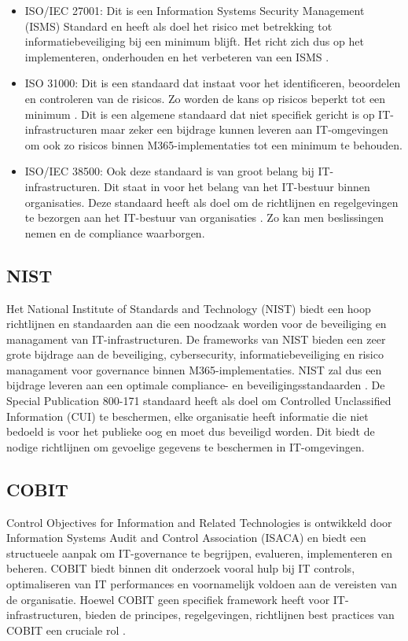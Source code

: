 \begin{itemize}
  \item ISO/IEC 27001:
  Dit is een Information Systems Security Management (ISMS) Standard en heeft als doel het risico met betrekking tot informatiebeveiliging bij een minimum blijft. Het richt zich dus op het implementeren, onderhouden en het verbeteren van een ISMS \autocite{VladisLavV.2008}.
  \item ISO 31000:
  Dit is een standaard dat instaat voor het identificeren, beoordelen en controleren van de risicos. Zo worden de kans op risicos beperkt tot een minimum \autocite{Carole2012}.
  Dit is een algemene standaard dat niet specifiek gericht is op IT-infrastructuren maar zeker een bijdrage kunnen leveren aan IT-omgevingen om ook zo risicos binnen M365-implementaties tot een minimum te behouden.
  \item ISO/IEC 38500:
  Ook deze standaard is van groot belang bij IT-infrastructuren. Dit staat in voor het belang van het IT-bestuur binnen organisaties. Deze standaard heeft als doel om de richtlijnen en regelgevingen te bezorgen aan het IT-bestuur van organisaties \autocite{Alan2023}. Zo kan men beslissingen nemen en de compliance waarborgen.

\end{itemize}

\subsection{NIST}
Het National Institute of Standards and Technology (NIST) biedt een hoop richtlijnen en standaarden aan die een noodzaak worden voor de beveiliging en managament van IT-infrastructuren. De frameworks van NIST bieden een zeer grote bijdrage aan de beveiliging, cybersecurity, informatiebeveiliging en risico managament voor governance binnen M365-implementaties.
NIST zal dus een bijdrage leveren aan een optimale compliance- en beveiligingsstandaarden \autocite{Sultan2017}.
De Special Publication 800-171 standaard heeft als doel om Controlled Unclassified Information (CUI) te beschermen, elke organisatie heeft informatie die niet bedoeld is voor het publieke oog en moet dus beveiligd worden. Dit biedt de nodige richtlijnen om gevoelige gegevens te beschermen in IT-omgevingen.

\subsection{COBIT}
Control Objectives for Information and Related Technologies is ontwikkeld door Information Systems Audit and Control Association (ISACA) en biedt een structueele aanpak om IT-governance te begrijpen, evalueren, implementeren en beheren. COBIT biedt binnen dit onderzoek vooral hulp bij IT controls, optimaliseren van IT performances en voornamelijk voldoen aan de vereisten van de organisatie.
Hoewel COBIT geen specifiek framework heeft voor IT-infrastructuren, bieden de principes, regelgevingen, richtlijnen best practices van COBIT een cruciale rol \autocite{George2014}. 

